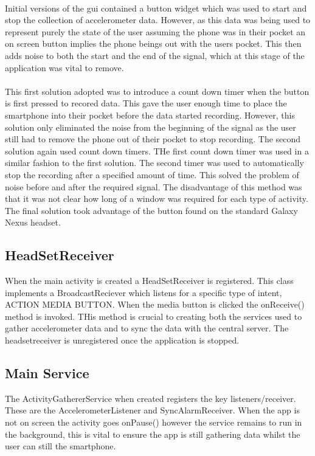 \paragraph{}
Initial versions of the gui contained a button widget which was used to start and stop the collection of accelerometer data. However, as this data was being used to represent purely the state of the user  assuming the phone was in their pocket an on screen button implies the phone beings out with the users pocket. This then adds noise to both the start and the end of the signal, which at this stage of the application was vital to remove. 
\paragraph{}
This first solution adopted was to introduce a count down timer when the button is first pressed to recored data. This gave the user enough time to place the smartphone into their pocket before the data started recording. However, this solution only eliminated the noise from the beginning of the signal as the user still had to remove the phone out of their pocket to stop recording. The second solution again used count down timers. THe first count down timer was used in a similar fashion to the first solution. The second timer was used to automatically stop the recording after a specified amount of time. This solved the problem of noise before and after the required signal. The disadvantage of this method was that it was not clear how long of a window was required for each type of activity. The final solution took advantage of the button found on the standard Galaxy Nexus headset. 

\subsection{HeadSetReceiver} %
\label{sub:subsection_headset}
When the main activity is created a HeadSetReceiver is registered. This class implements a BroadcastReciever which listens for a specific type of intent, ACTION MEDIA BUTTON. When the media button is clicked the onReceive() method is invoked. THis method is crucial to creating both the services used to gather accelerometer data and to sync the data with the central server. The headsetreceiver is unregistered once the application is stopped.

\subsection{Main Service} %
\label{sub:main_service}
The ActivityGathererService when created registers the key listeners/receiver. These are the AccelerometerListener and SyncAlarmReceiver. When the app is not on screen the activity goes onPause() however the service remains to run in the background, this is vital to ensure the app is still gathering data whilst the user can still the smartphone.

